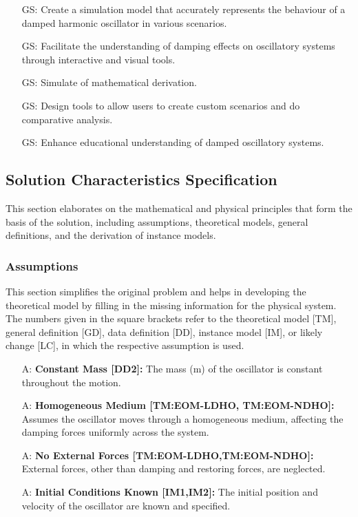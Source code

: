\documentclass[12pt]{article}
\newcounter{assumpnum} %
\newcounter{goalnum} %
\begin{document}
\begin{itemize}

  \item[GS\refstepcounter{goalnum}\thegoalnum \label{GS1}:] Create a simulation model that accurately represents the 
  behaviour of a damped harmonic oscillator in various scenarios.
  \item[GS\refstepcounter{goalnum}\thegoalnum \label{GS2}:] Facilitate the understanding of damping effects on 
  oscillatory systems through interactive and visual tools.
  \item[GS\refstepcounter{goalnum}\thegoalnum \label{GS3}:] Simulate of mathematical derivation.
  \item[GS\refstepcounter{goalnum}\thegoalnum \label{GS4}:] Design tools to allow users to create custom scenarios and 
  do comparative analysis. 
  \item[GS\refstepcounter{goalnum}\thegoalnum \label{GS5}:] Enhance educational understanding of damped oscillatory 
  systems.
  
\end{itemize}

\subsection{Solution Characteristics Specification}

This section elaborates on the mathematical and physical principles that form 
the basis of the solution, including assumptions, theoretical models, general 
definitions, and the derivation of instance models.

\subsubsection{Assumptions} \label{sec_assumpt}

This section simplifies the original problem and helps in developing the
theoretical model by filling in the missing information for the physical system.
The numbers given in the square brackets refer to the theoretical model [TM],
general definition [GD], data definition [DD], instance model [IM], or likely
change [LC], in which the respective assumption is used.

\begin{itemize}
\item[A\refstepcounter{assumpnum}\theassumpnum \label{A1}:]
\textbf{Constant Mass [DD2]:} The mass (m) of the oscillator is constant throughout the motion.
\item[A\refstepcounter{assumpnum}\theassumpnum \label{A2}:]
\textbf{Homogeneous Medium [TM:EOM-LDHO, TM:EOM-NDHO]:} Assumes the oscillator moves through a homogeneous medium, affecting the damping forces uniformly across the system.
\item[A\refstepcounter{assumpnum}\theassumpnum \label{A3}:]
\textbf{No External Forces [TM:EOM-LDHO,TM:EOM-NDHO]:} External forces, other 
than damping and restoring forces, are neglected.
\item[A\refstepcounter{assumpnum}\theassumpnum \label{A4}:]
\textbf{Initial Conditions Known [IM1,IM2]:} The initial position and velocity of the oscillator are known and specified.
\end{itemize}
\end{document}
